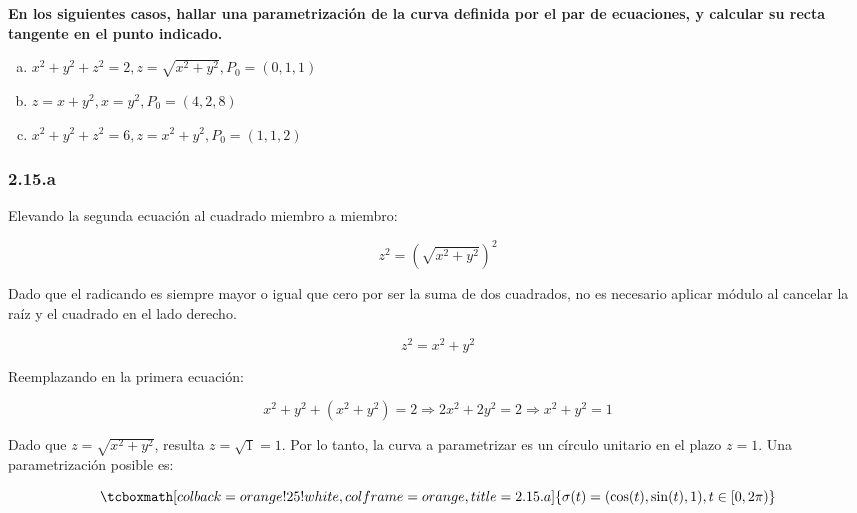 \documentclass{article}
\begin{document}
\textbf{En los siguientes casos, hallar una parametrización de la curva definida por el par de ecuaciones, y calcular su recta tangente en el punto indicado.}

\begin{enumerate}[(a)]
\bfseries

\item $x^2 + y^2 + z^2 = 2, z = \sqrt{x^2 + y^2}, P_0 = (0, 1, 1)$

\item $z = x + y^2, x = y^2, P_0 = (4, 2, 8)$

\item $x^2 + y^2 + z^2 = 6, z = x^2 + y^2, P_0 = (1, 1, 2)$

\end{enumerate}

\subsubsection*{2.15.a}
\label{subsubsec:2.15.a}

Elevando la segunda ecuación al cuadrado miembro a miembro:

\begin{equation}
z^2 = (\sqrt{ x^2+y^2 })^2
\end{equation}

Dado que el radicando es siempre mayor o igual que cero por ser la suma de dos cuadrados, no es necesario aplicar módulo al cancelar la raíz y el cuadrado en el lado derecho.

\begin{equation}
z^2 = x^2 + y^2
\end{equation}

Reemplazando en la primera ecuación:

\begin{equation}
x^2 + y^2 + (x^2 + y^2) = 2 \Rightarrow 2x^2 + 2y^2 = 2 \Rightarrow x^2 + y^2 = 1
\end{equation}

Dado que $z = \sqrt{x^2 + y^2}$, resulta $z = \sqrt{1} = 1$. Por lo tanto, la curva a parametrizar es un círculo unitario en el plazo $z=1$. Una parametrización posible es:

\begin{equation}
\tcboxmath[colback=orange!25!white,colframe=orange,title=2.15.a]
{
\sigma(t) = (\cos(t), \sin(t), 1), t \in [0, 2\pi)
}
\end{equation}
\end{document}
